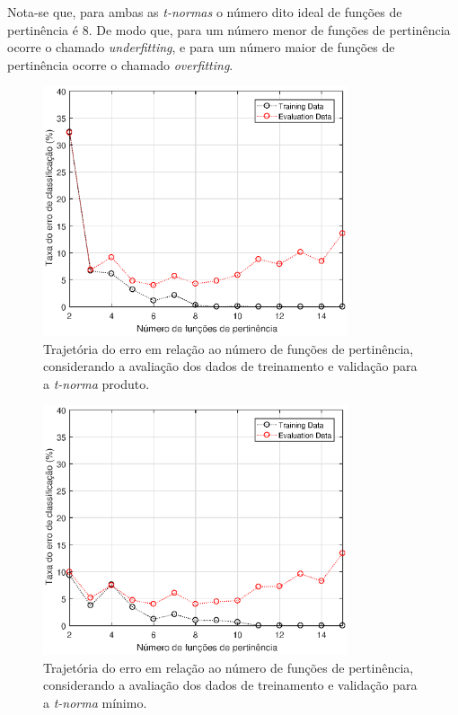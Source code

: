 \documentclass[12pt,a4paper]{article}
\numberwithin{equation}{section}
\begin{document}
Nota-se que, para ambas as \textit{t-normas} o número dito ideal de funções de pertinência é $8$. De modo que, para um número menor de funções de pertinência ocorre o chamado \textit{underfitting}, e para um número maior de funções de pertinência ocorre o chamado \textit{overfitting}.


\begin{figure}[ht!]
\centering
\includegraphics[width=0.8\textwidth]{figures/error_product.eps}
\caption{Trajetória do erro em relação ao número de funções de pertinência, considerando a avaliação dos dados de treinamento e validação para a \textit{t-norma} produto.}
\label{fig:error_product}
\end{figure}

\begin{figure}[ht!]
\centering
\includegraphics[width=0.8\textwidth]{figures/error_minimum.eps}
\caption{Trajetória do erro em relação ao número de funções de pertinência, considerando a avaliação dos dados de treinamento e validação para a \textit{t-norma} mínimo.}
\label{fig:error_minimum}
\end{figure}
\end{document}
